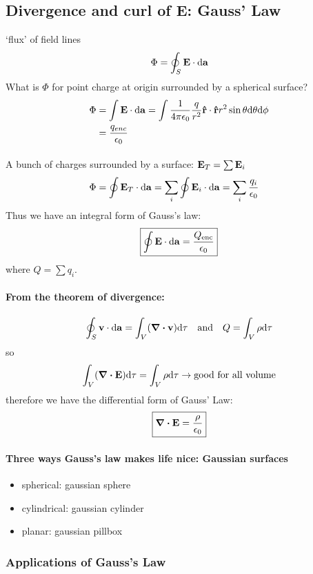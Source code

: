 \documentclass[../main.tex]{subfiles}
\begin{document}
\subsection{Divergence and curl of E: Gauss' Law}

`flux' of field lines
\[ \Phi = \oint_S \vb E \cdot \dd{\vb a} \]
What is $\Phi$ for point charge at origin surrounded by a spherical surface?
\begin{align*}
    \Phi &= \int \vb E \cdot \dd \vb a = \int \frac{1}{4\pi\epsilon_0} \frac{q}{r^2} \vu r \cdot \vu r r^2 \sin\theta \dd \theta \dd \phi \\
    &= \frac{q_{enc}}{\epsilon_0}
\end{align*}
\paragraph*{} A bunch of charges surrounded by a surface: \(\vb E_T = \sum \vb E_i\)
\begin{align*}
    \Phi &= \oint \vb E_T \cdot \dd\vb a = \sum_i \oint \vb E_i \cdot \dd \vb a = \sum_i \frac{q_i}{\epsilon_0}
\end{align*}
Thus we have an integral form of Gauss's law:
\begin{align*}
    \boxed{\oint \vb E \cdot \dd\vb a = \frac{Q_{\textrm{enc}}}{\epsilon_0}}
\end{align*}
where $Q = \sum q_i$.
\paragraph*{From the theorem of divergence:}
\[\oint_S \vb v \cdot \dd\vb a = \int_V (\div \vb v) \dd\tau \qand Q = \int_V \rho \dd\tau \]
so
\[\int_V (\div \vb E)\dd\tau = \int_V \rho \dd\tau \to \textrm{good for all volume}\]
therefore we have the differential form of Gauss' Law:
\[\boxed{\div \vb E = \frac{\rho}{\epsilon_0}}\]
\paragraph*{Three ways Gauss's law makes life nice: Gaussian surfaces}
\begin{itemize}
    \item spherical: gaussian sphere
    \item cylindrical: gaussian cylinder
    \item planar: gaussian pillbox
\end{itemize}

\newpage
{}

\subsubsection{Applications of Gauss's Law}
\end{document}
